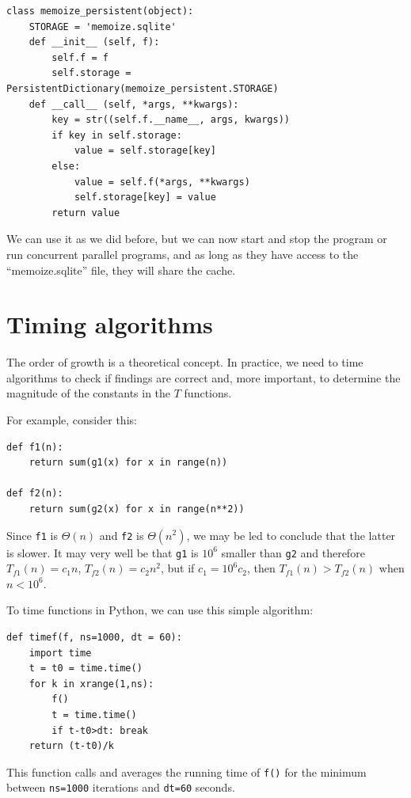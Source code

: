 \documentclass[justified,sixbynine]{tufte-book}
\def\ft{\small\tt}
\theoremstyle{plain}%
\theoremstyle{definition}
\theoremstyle{remark}
\begin{document}
\begin{fullwidth}
\begin{lstlisting}[caption={in file: {\ft nlib.py}}]
class memoize_persistent(object):
    STORAGE = 'memoize.sqlite'
    def __init__ (self, f):
        self.f = f
        self.storage = PersistentDictionary(memoize_persistent.STORAGE)
    def __call__ (self, *args, **kwargs):
        key = str((self.f.__name__, args, kwargs))
        if key in self.storage:
            value = self.storage[key]
        else:
            value = self.f(*args, **kwargs)
            self.storage[key] = value
        return value
\end{lstlisting}

We can use it as we did before, but we can now start and stop the program or run concurrent parallel programs, and as long as they have access to the ``memoize.sqlite'' file, they will share the cache.


\goodbreak\section{Timing algorithms}

The order of growth is a theoretical concept. In practice, we need to time algorithms to check if findings are correct and, more important, to determine the magnitude of the constants in the $T$ functions.

For example, consider this:
\begin{lstlisting}
def f1(n):
    return sum(g1(x) for x in range(n))

def f2(n):
    return sum(g2(x) for x in range(n**2))
\end{lstlisting}


Since {\ft f1} is $\Theta(n)$ and {\ft f2} is $\Theta(n^2)$, we may be led to conclude that the latter is slower. It may very well be that {\ft g1} is $10^6$ smaller than {\ft g2} and therefore $T_{f1}(n) = c_1 n$, $T_{f2}(n) = c_2 n^2$, but if $c_1 = 10^6 c_2$, then $T_{f1}(n) > T_{f2}(n)$ when $n<10^6$.

To time functions in Python, we can use this simple algorithm:

\begin{lstlisting}
def timef(f, ns=1000, dt = 60):
    import time
    t = t0 = time.time()
    for k in xrange(1,ns):
        f()
        t = time.time()
        if t-t0>dt: break
    return (t-t0)/k
\end{lstlisting}

This function calls and averages the running time of {\ft f()} for the minimum between {\ft ns=1000} iterations and {\ft dt=60} seconds.


\end{fullwidth}
\end{document}
